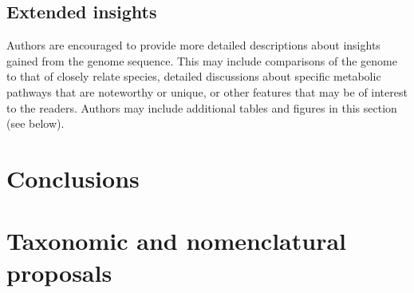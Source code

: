 \documentclass{bmcart}
\begin{document}
\subsection*{Extended insights}
Authors are encouraged to provide more detailed descriptions about insights gained from the genome sequence. This may include comparisons of the genome to that of closely relate species, detailed discussions about specific metabolic pathways that are noteworthy or unique, or other features that may be of interest to the readers. Authors may include additional tables and figures in this section (see below).

\section*{Conclusions}

\section*{Taxonomic and nomenclatural proposals}
\end{document}
